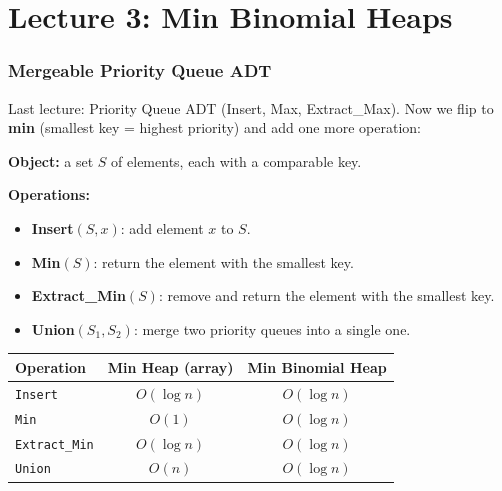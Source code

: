 \documentclass[11pt]{article}
\begin{document}

\part*{\textcolor{utnavy}{Lecture 3: Min Binomial Heaps}}
\setcounter{section}{0}

\section{Mergeable Priority Queue ADT}

Last lecture: Priority Queue ADT (Insert, Max, Extract\_Max). Now we flip to \textbf{min} (smallest key = highest priority) and add one more operation:

\begin{defbox}
\textbf{Object:} a set $S$ of elements, each with a comparable \textcolor{rustW}{key}.

\textbf{Operations:}
\begin{itemize}[leftmargin=1.4em,itemsep=1pt]
  \item \textbf{Insert}$(S, x)$: add element $x$ to $S$.
  \item \textbf{Min}$(S)$: return the element with the smallest key.
  \item \textbf{Extract\_Min}$(S)$: remove and return the element with the smallest key.
  \item \textbf{Union}$(S_1, S_2)$: merge two priority queues into a single one.
\end{itemize}
\end{defbox}

\begin{center}
\renewcommand{\arraystretch}{1.5}
\begin{tabular}{l c c}
\hline
\textbf{\textcolor{heapblue}{Operation}} & \textbf{Min Heap (array)} & \textbf{Min Binomial Heap}\\
\hline
\texttt{Insert} & $O(\log n)$ & $O(\log n)$\\
\texttt{Min} & \textcolor{greenO}{$O(1)$} & $O(\log n)$\\
\texttt{Extract\_Min} & $O(\log n)$ & $O(\log n)$\\
\texttt{Union} & \textcolor{rustW}{$O(n)$} & \textcolor{greenO}{$O(\log n)$}\\
\hline
\end{tabular}
\end{center}
\end{document}

